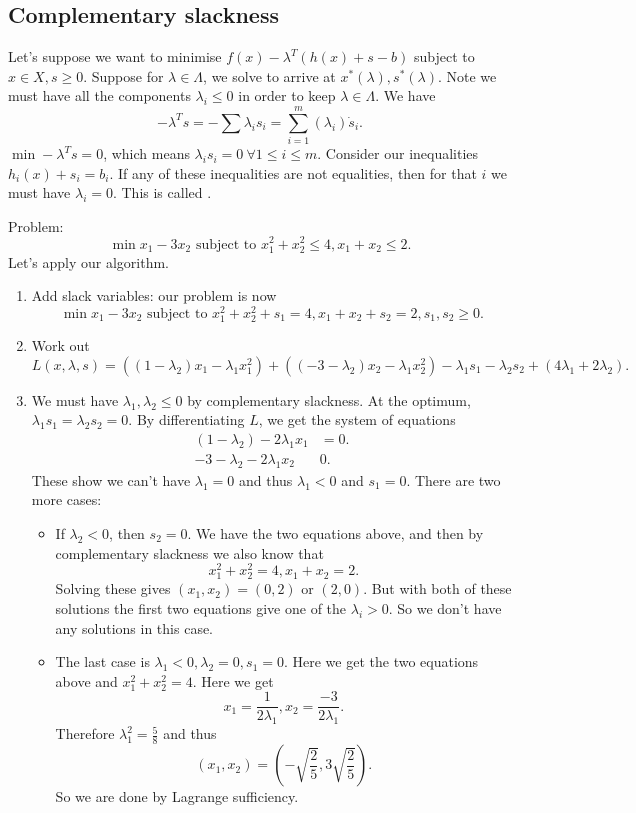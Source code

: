 \documentclass[a4paper]{scrartcl}
\begin{document}
\subsection{Complementary slackness}
Let's suppose we want to minimise $f(x)-\lambda^T (h(x)+s-b)$ subject to $ x \in X, s \geq 0$. Suppose for $\lambda \in \Lambda$, we solve to arrive at $x^*(\lambda), s^*(\lambda)$. Note we must have all the components $\lambda_i\leq 0$ in order to keep $\lambda \in \Lambda$. We have 
\[-\lambda^T s=-\sum \lambda_i s_i=\sum_{i=1}^{m}(\lambda_i)\dot s_i.\]
$\min -\lambda^T s =0$, which means $\lambda_i s_i=0 \ \forall 1 \leq i \leq m$.
Consider our inequalities $h_i(x)+s_i=b_i$. If any of these inequalities are not equalities, then for that $i$ we must have $\lambda_i=0$. This is called .

\begin{example}
	Problem: 
	\[\min x_1-3x_2 \text{ subject to } x_1^2+x_2^2 \leq 4,  x_1+x_2 \leq 2.\]
	Let's apply our algorithm.
	\begin{enumerate}
		\item Add slack variables: our problem is now \[\min x_1-3x_2 \text{ subject to } x_1^2+x_2^2+s_1= 4,  x_1+x_2+s_2= 2, s_1,s_2 \geq 0.\]
		\item Work out 
		\[L(x,\lambda,s)=((1-\lambda_2)x_1-\lambda_1 x_1^2)+((-3 -\lambda_2)x_2-\lambda_1x_2^2)-\lambda_1s_1-\lambda_2s_2+(4 \lambda_1+2 \lambda_2).\]
		\item We must have $\lambda_1,\lambda_2\leq 0$ by complementary slackness. At the optimum, $\lambda_1s_1=\lambda_2 s_2=0$. By differentiating $L$, we get the system of equations 
		\begin{align*}
			(1-\lambda_2)-2 \lambda_1 x_1 &=0.\\
			-3-\lambda_2-2\lambda_1 x_2 &0.
		\end{align*}
		These show we can't have $\lambda_1=0$ and thus $\lambda_1 <0$ and $s_1=0$. There are two more cases:
		\begin{itemize}
			\item If $\lambda_2<0$, then $s_2=0$. We have the two equations above, and then by complementary slackness we also know that 
			\[x_1^2+x_2^2=4, x_1+x_2=2.\]
			Solving these gives $(x_1,x_2)=(0,2)$ or $(2,0)$. But with both of these solutions the first two equations give one of the $\lambda_i >0$. So we don't have any solutions in this case.
			\item The last case is $\lambda_1<0,\lambda_2=0,s_1=0$. Here we get the two equations above and $x_1^2+x_2^2=4$. Here we get 
			\[x_1=\frac{1}{2\lambda_1}, x_2=\frac{-3}{2\lambda_1}.\]
			Therefore $\lambda_1^2=\frac{5}{8}$ and thus 
			\[(x_1,x_2)=(-\sqrt{\frac{2}{5}},3 \sqrt{\frac{2}{5}}).\]
			So we are done by Lagrange sufficiency.
		\end{itemize}
	\end{enumerate}
\end{example}
\end{document}
